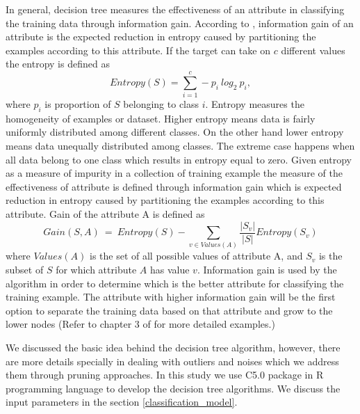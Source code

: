In general, decision tree measures the effectiveness of an attribute in classifying the training data through information gain. According to  \citet{Mitchell_1997_Book}, information gain of an attribute is the expected reduction in entropy caused by partitioning the examples according to this attribute. If the target can take on $c$ different values the entropy is defined as
% 
\begin{equation}
Entropy(S) = \sum_{i=1}^{c} -p_{i}\ log_2\ p_i,
\end{equation}
% 
where $p_i$ is proportion of $S$ belonging to class $i$. Entropy measures the homogeneity of examples or dataset. Higher entropy means data is  fairly uniformly distributed among different classes. On the other hand lower entropy means data unequally distributed among classes. The extreme case happens when all data belong to one class which results in entropy equal to zero. Given entropy as a measure of impurity in a collection of training example the measure of the effectiveness of attribute is defined through information gain which is expected reduction in entropy caused by partitioning the examples according to this attribute. Gain of the attribute A is defined as 
% 
\begin{equation}
Gain(S,A)\ =\ Entropy(S) - \sum_{v \in Values(A) } \frac{|S_v|}{|S|} Entropy(S_v)
\end{equation} 
% 
where $Values(A)$ is the set of all possible values of attribute A, and $S_v$ is the subset of $S$ for which attribute $A$ has value $v$. Information gain is used by the algorithm in order to determine which is the better attribute for classifying the training example. The attribute with higher information gain will be the first option to separate the training data based on that attribute and grow to the lower nodes (Refer to chapter 3 of \citet{Mitchell_1997_Book} for more detailed examples.)

We discussed the basic idea behind the decision tree algorithm, however, there are more details specially in dealing with outliers and noises which we address them through pruning approaches. In this study we use C5.0 package \citep{C50_2015} in R programming language \citep{R_2016_program} to develop the decision tree algorithms. We discuss the input parameters in the section \ref{classification_model}.  

